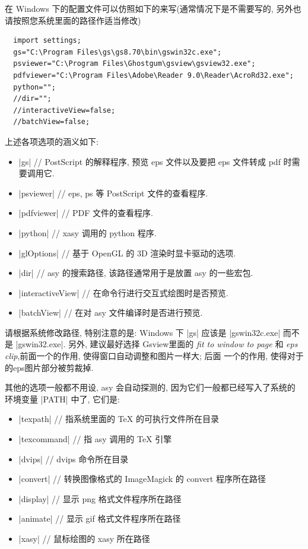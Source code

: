 \documentclass[nofonts,CJKnormalspaces]{ctexbook}[2009/05/20]
\begin{document}
在 Windows 下的配置文件可以仿照如下的来写(通常情况下是不需要写的,
另外也请按照您系统里面的路径作适当修改)

\begin{lstlisting}
  import settings;
  gs="C:\Program Files\gs\gs8.70\bin\gswin32c.exe";
  psviewer="C:\Program Files\Ghostgum\gsview\gsview32.exe";
  pdfviewer="C:\Program Files\Adobe\Reader 9.0\Reader\AcroRd32.exe";
  python="";
  //dir="";
  //interactiveView=false;
  //batchView=false;
\end{lstlisting}

上述各项选项的涵义如下:
\begin{itemize}
\item |gs| // PostScript 的解释程序, 预览 eps 文件以及要把 eps 文件转成 pdf
  时需要调用它.
\item |psviewer| //  eps, ps 等 PostScript 文件的查看程序.
\item |pdfviewer| // PDF 文件的查看程序.
\item |python| // xasy 调用的 python 程序.
\item |glOptions| // 基于 OpenGL 的 3D 渲染时显卡驱动的选项.
\item |dir|    // asy 的搜索路径, 该路径通常用于是放置 asy 的一些宏包.
\item |interactiveView| // 在命令行进行交互式绘图时是否预览.
\item |batchView| // 在对 asy 文件编译时是否进行预览.
\end{itemize}
请根据系统修改路径, 特别注意的是: Windows 下 |gs| 应该是 |gswin32c.exe| 而不是
|gswin32.exe|. 另外, 建议最好选择 Gsview里面的 \emph{fit to window to page}
和 \emph{eps clip},前面一个的作用, 使得窗口自动调整和图片一样大; 后面
一个的作用, 使得对于的eps图片部分被剪裁掉.

其他的选项一般都不用设, asy 会自动探测的, 因为它们一般都已经写入了系统的
环境变量 |PATH| 中了, 它们是:
\begin{itemize}
\item |texpath| // 指系统里面的 TeX 的可执行文件所在目录
\item |texcommand| // 指 asy 调用的 TeX 引擎
\item |dvips|  // dvips 命令所在目录
\item |convert| // 转换图像格式的 ImageMagick 的 convert 程序所在路径
\item |display| // 显示 png 格式文件程序所在路径
\item |animate| // 显示 gif 格式文件程序所在路径
\item |xasy| // 鼠标绘图的 xasy 所在路径
\end{itemize}
\end{document}
